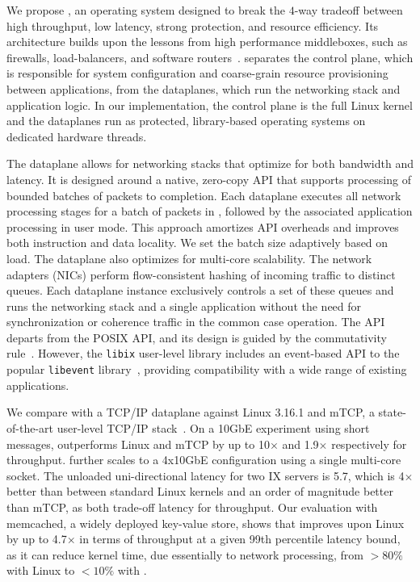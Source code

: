 We propose \ix, an operating system designed to break the $4$-way
tradeoff between high throughput, low latency, strong protection, and
resource efficiency. Its architecture builds upon the lessons from
high performance middleboxes, such as firewalls, load-balancers, and
software routers~\cite{routebricks,click}. \ix separates the control
plane, which is responsible for system configuration and coarse-grain
resource provisioning between applications, from the dataplanes, which
run the networking stack and application logic.
In our implementation, the
control plane is the full Linux kernel and the dataplanes run as
protected, library-based operating systems on dedicated hardware
threads.

The \ix dataplane allows for networking stacks that optimize for both
bandwidth and latency. It is designed around a native, zero-copy API
that supports processing of bounded batches of packets to
completion. Each dataplane executes all network processing stages
for a batch of packets in , followed by the associated application processing in user mode. This approach amortizes API
overheads and improves both instruction and data locality. We set the
batch size adaptively based on load. The \ix dataplane also optimizes
for multi-core scalability.  The network adapters (NICs) perform
flow-consistent hashing of incoming traffic to distinct queues. Each
dataplane instance exclusively controls a set of these queues and runs
the networking stack and a single application without the need for
synchronization or coherence traffic in the common case operation. The
\ix API departs from the POSIX API, and its design is guided by the commutativity
rule~\cite{DBLP:conf/sosp/ClementsKZMK13}.  However, the \texttt{libix}
user-level library includes an event-based API  to the
popular \texttt{libevent} library~\cite{provos2003libevent}, providing
compatibility with a wide range of existing applications.

We compare \ix with a TCP/IP dataplane against Linux
3.16.1 and mTCP, a state-of-the-art user-level TCP/IP
stack~\cite{jeong2014mtcp}.  On a 10GbE experiment using short messages, \ix outperforms Linux and mTCP by up to
10$\times$ and 1.9$\times$ respectively for throughput. \ix
further scales to a 4x10GbE configuration using a single multi-core socket.
The unloaded uni-directional latency for two IX servers is
5.7\microsecond, which is 4$\times$ better than between standard
Linux kernels and an order of magnitude better than mTCP, as both
trade-off latency for throughput.  Our evaluation with memcached, a
widely deployed key-value store, shows that \ix improves upon Linux by
up to 4.7$\times$ in terms of throughput at a given 99th
percentile latency bound, as it can reduce kernel time, due
essentially to network processing, from $>80\%$ with Linux to
$<10\%$ with \ix.

